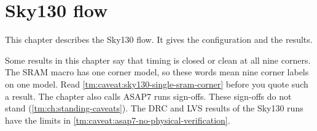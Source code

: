 \chapter{Sky130 flow}\label{tm:ch:sky130-flow}

This chapter describes the Sky130 flow. It gives the configuration and the results.

\begin{information}
Some results in this chapter say that timing is closed or clean at all nine corners. The SRAM macro has one corner model, so these words mean nine corner labels on one model. Read \cref{tm:caveat:sky130-single-sram-corner} before you quote such a result. The chapter also calls ASAP7 runs sign-offs. These sign-offs do not stand (\cref{tm:ch:standing-caveats}). The DRC and LVS results of the Sky130 runs have the limits in \cref{tm:caveat:asap7-no-physical-verification}.
\end{information}

